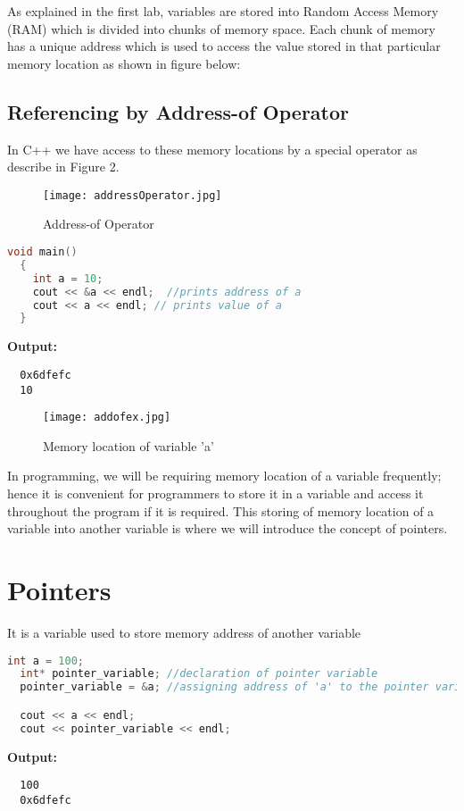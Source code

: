 \documentclass[11pt,fleqn]{book} %
\begin{document}
As explained in the first lab, variables are stored into Random Access Memory (RAM) which is divided into chunks of memory space. Each chunk of memory has a unique address which is used to access the value stored in that particular memory location as shown in figure below:


\subsection{Referencing by Address-of Operator}
In C++ we have access to these memory locations by a special operator as describe in Figure 2.

\begin{figure}[h]
  \centering\texttt{[image: addressOperator.jpg]}
  \caption{Address-of Operator}
\end{figure}

\begin{lstlisting}[language=C++, caption = Address of a variable]
  void main()
  {
    int a = 10;
    cout << &a << endl;  //prints address of a
    cout << a << endl; // prints value of a 
  }
\end{lstlisting}
\textbf{Output:}
\begin{lstlisting}
  0x6dfefc 
  10
\end{lstlisting}

\begin{figure}[h]
  \centering\texttt{[image: addofex.jpg]}
  \caption{Memory location of variable 'a'}
\end{figure} 
In programming, we will be requiring memory location of a variable frequently; hence it is convenient for programmers to store it in a variable and access it throughout the program if it is required. This storing of memory location of a variable into another variable is where we will introduce the concept of pointers. 
\section{Pointers}
\begin{definition}[Pointer] It is a variable used to store memory address of another variable
\end{definition}
\begin{lstlisting}[language=C++, caption = Pointer variable]
  int a = 100;
  int* pointer_variable; //declaration of pointer variable
  pointer_variable = &a; //assigning address of 'a' to the pointer variable

  cout << a << endl;
  cout << pointer_variable << endl;

\end{lstlisting}
\textbf{Output:} 
\begin{lstlisting}
  100
  0x6dfefc
\end{lstlisting}
\end{document}
